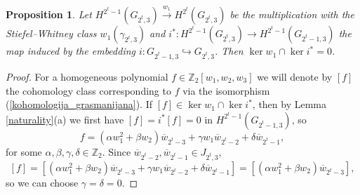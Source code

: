 \documentclass{amsart}
\newtheorem{proposition}[theorem]{Proposition}
\theoremstyle{definition}
\theoremstyle{remark}
\numberwithin{equation}{section}
\begin{document}
\begin{proposition}\label{kercapker2} Let $H^{2^t-1}(G_{2^t,3})\stackrel{w_1}\longrightarrow H^{2^t}(G_{2^t,3})$ be the multiplication with the Stiefel--Whitney class $w_1(\gamma_{2^t,3})$ and $i^*:H^{2^t-1}(G_{2^t,3})\rightarrow H^{2^t-1}(G_{2^t-1,3})$ the map induced by the embedding $i:G_{2^t-1,3}\hookrightarrow G_{2^t,3}$. Then
    $\ker w_1\cap \ker i^* = 0$.
\end{proposition}
\begin{proof}
    For a homogeneous polynomial $f\in\mathbb Z_2[w_1,w_2,w_3]$ we will denote by $[f]$ the cohomology class corresponding to $f$ via the isomorphism (\ref{kohomologija_grasmanijana}). If $[f]\in\ker w_1\cap \ker i^*$, then by Lemma \ref{naturality}(a) we first have $[f] = i^*[f] = 0$ in $H^{2^t-1}(G_{2^t-1,3})$, so 
    \[f = (\alpha w_1^2 + \beta w_2)\overline w_{2^t-3} + \gamma w_1\overline w_{2^t-2} + \delta \overline w_{2^t-1},\]
    for some $\alpha,\beta,\gamma,\delta\in\mathbb Z_2$. Since $\overline w_{2^t-2}, \overline w_{2^t-1}\in J_{2^t,3}$,
    \[[f] = [(\alpha w_1^2 + \beta w_2)\overline w_{2^t-3} + \gamma w_1\overline w_{2^t-2} + \delta \overline w_{2^t-1}] = [(\alpha w_1^2 + \beta w_2)\overline w_{2^t-3}],\]
    so we can choose $\gamma = \delta = 0$. 


\end{proof}
\end{document}
